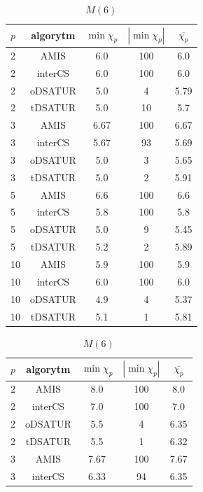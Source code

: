 \documentclass[10pt,a4paper]{article}
\begin{document}
\begin{table}[H]
\begin{minipage}{.5\linewidth}
			\caption{$M(5)$}
		\end{minipage}
		\begin{minipage}{.5\linewidth}
			\centering
			\begin{tabular}{|l|c|c|c|c|}
				\hline
				\textbf{$p$} & \textbf{algorytm} & \textbf{$\min \chi_{p}$} & \textbf{$|\min \chi_{p}|$} & \textbf{$\overline{\chi_{p}}$} \\
				\hline
				2 & AMIS & 6.0 & 100 & 6.0 \\
				2 & interCS & 6.0 & 100 & 6.0 \\
				2 & oDSATUR & 5.0 & 4 & 5.79 \\
				2 & tDSATUR & 5.0 & 10 & 5.7 \\
				\hline
				3 & AMIS & 6.67 & 100 & 6.67 \\
				3 & interCS & 5.67 & 93 & 5.69 \\
				3 & oDSATUR & 5.0 & 3 & 5.65 \\
				3 & tDSATUR & 5.0 & 2 & 5.91 \\
				\hline
				5 & AMIS & 6.6 & 100 & 6.6 \\
				5 & interCS & 5.8 & 100 & 5.8 \\
				5 & oDSATUR & 5.0 & 9 & 5.45 \\
				5 & tDSATUR & 5.2 & 2 & 5.89 \\
				\hline
				10 & AMIS & 5.9 & 100 & 5.9 \\
				10 & interCS & 6.0 & 100 & 6.0 \\
				10 & oDSATUR & 4.9 & 4 & 5.37 \\
				10 & tDSATUR & 5.1 & 1 & 5.81 \\
				\hline
			\end{tabular}
			\caption{$M(6)$}
		\end{minipage}
		\begin{minipage}{\linewidth}
			\centering
			\begin{tabular}{|l|c|c|c|c|}
				\hline
				\textbf{$p$} & \textbf{algorytm} & \textbf{$\min \chi_{p}$} & \textbf{$|\min \chi_{p}|$} & \textbf{$\overline{\chi_{p}}$} \\
				\hline
				2 & AMIS & 8.0 & 100 & 8.0 \\
				2 & interCS & 7.0 & 100 & 7.0 \\
				2 & oDSATUR & 5.5 & 4 & 6.35 \\
				2 & tDSATUR & 5.5 & 1 & 6.32 \\
				\hline
				3 & AMIS & 7.67 & 100 & 7.67 \\
				3 & interCS & 6.33 & 94 & 6.35 \\

\end{tabular}
\end{minipage}
\end{table}
\end{document}
